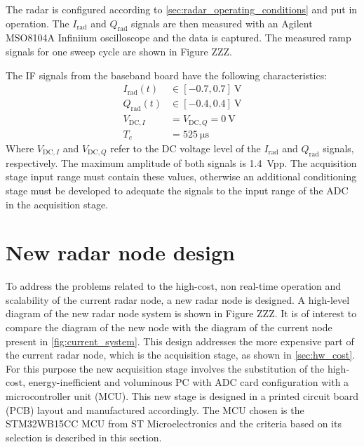 The radar is configured according to \cref{sec:radar_operating_conditions} and put in operation. The $I_\mathrm{rad}$ and $Q_\mathrm{rad}$ signals are then measured with an Agilent MSO8104A Infiniium oscilloscope and the data is captured. The measured ramp signals for one sweep cycle are shown in Figure ZZZ.

The IF signals from the baseband board have the following characteristics:
\begin{align} \label{eqn:iq_volts}
	I_\mathrm{rad}(t) &\in [-0.7, 0.7]\ \si{\volt} \\
	Q_\mathrm{rad}(t) &\in [-0.4, 0.4]\ \si{\volt} \\
	V_{\mathrm{DC},I} &= V_{\mathrm{DC},Q} = \SI{0}{\volt} \\
	T_c &= \SI{525}{\micro\second}
\end{align}
Where $V_{\mathrm{DC},I}$ and $V_{\mathrm{DC},Q}$ refer to the DC voltage level of the $I_\mathrm{rad}$ and $Q_\mathrm{rad}$ signals, respectively. The maximum amplitude of both signals is \SI{1.4}{Vpp}. The acquisition stage input range must contain these values, otherwise an additional conditioning stage must be developed to adequate the signals to the input range of the ADC in the acquisition stage. 

\section{New radar node design}

To address the problems related to the high-cost, non real-time operation and scalability of the current radar node, a new radar node is designed. A high-level diagram of the new radar node system is shown in Figure ZZZ. It is of interest to compare the diagram of the new node with the diagram of the current node present in \cref{fig:current_system}. This design addresses the more expensive part of the current radar node, which is the acquisition stage, as shown in \cref{sec:hw_cost}. For this purpose the new acquisition stage involves the substitution of the high-cost, energy-inefficient and voluminous PC with ADC card configuration with a microcontroller unit (MCU). This new stage is designed in a printed circuit board (PCB) layout and manufactured accordingly. The MCU chosen is the STM32WB15CC MCU from ST Microelectronics \cite{STMicroelectronics2022} and the criteria based on its selection is described in this section.

